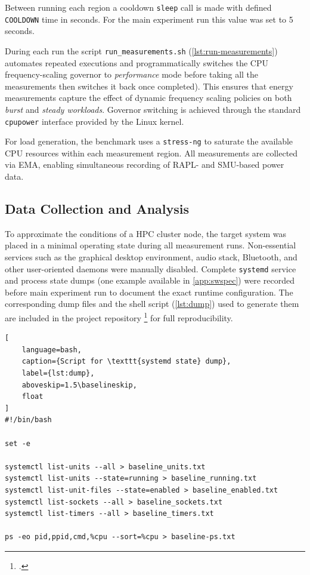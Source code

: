 Between running each region a cooldown \texttt{sleep} call is made with
defined \texttt{COOLDOWN} time in seconds. For the main experiment run this
value was set to 5 seconds.

During each run the script \lstinline|run_measurements.sh|
(\cref{lst:run-measurements}) automates repeated executions and
programmatically switches the \gls{CPU} frequency-scaling governor to
\emph{performance} mode before taking all the measurements then switches it
back once completed). This ensures that energy measurements capture the
effect of dynamic frequency scaling policies on both \emph{burst} and
\emph{steady workloads}. Governor switching is achieved through the standard
\texttt{cpupower} interface provided by the Linux kernel.

For load generation, the benchmark uses a \texttt{stress-ng}
\parencite{stress-ng} to saturate the available CPU resources within each
measurement region. All measurements are collected via \gls{EMA}, enabling
simultaneous recording of \gls{RAPL}- and \gls{SMU}-based power data.

\subsection{Data Collection and Analysis}

To approximate the conditions of a \gls{HPC} cluster node, the target system
was placed in a minimal operating state during all measurement runs.
Non-essential services such as the graphical desktop environment, audio stack,
Bluetooth, and other user-oriented daemons were manually disabled.
Complete \texttt{systemd} service and process state dumps (one example
available in \cref{app:swspec}) were recorded before main experiment run to
document the exact runtime configuration. The corresponding dump files and the
shell script (\cref{lst:dump}) used to generate them are included in the
project repository \footcite{yahdzhyiev2025repo} for full reproducibility.

\begin{samepage}
\begin{lstlisting}[
    language=bash,
    caption={Script for \texttt{systemd state} dump},
    label={lst:dump},
    aboveskip=1.5\baselineskip,
    float
]
#!/bin/bash

set -e

systemctl list-units --all > baseline_units.txt
systemctl list-units --state=running > baseline_running.txt
systemctl list-unit-files --state=enabled > baseline_enabled.txt
systemctl list-sockets --all > baseline_sockets.txt
systemctl list-timers --all > baseline_timers.txt

ps -eo pid,ppid,cmd,%cpu --sort=%cpu > baseline-ps.txt
\end{lstlisting}
\end{samepage}

